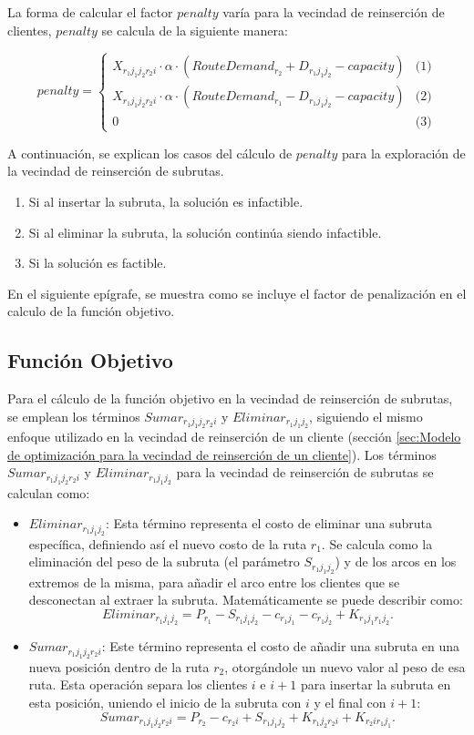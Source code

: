\documentclass[12pt]{report}
\begin{document}
	La forma de calcular el factor $penalty$ varía para la vecindad de reinserción de clientes, $penalty$ se calcula de la siguiente manera:


	\[ 			penalty =
	\begin{cases}
		X_{r_1j_1j_2r_2i} \cdot \alpha \cdot (RouteDemand_{r_2} + D_{r_1j_1j_2} - capacity) & \text{(1)} \\
		X_{r_1j_1j_2r_2i} \cdot \alpha \cdot (RouteDemand_{r_1} - D_{r_1j_1j_2} - capacity) & \text{(2)} \\
		0 & \text{(3)}
	\end{cases} \]


	A continuación, se explican los casos del cálculo de $penalty$ para la exploración de la vecindad de reinserción de subrutas.

	\begin{enumerate}
		\item Si al insertar la subruta, la solución es infactible.
		\item Si al eliminar la subruta, la solución continúa siendo infactible.
		\item Si la solución es factible.
	\end{enumerate}

	En el siguiente epígrafe, se muestra como se incluye el factor de penalización en el calculo de la función objetivo.

	\subsection{Función Objetivo}

	Para el cálculo de la función objetivo en la vecindad de reinserción de subrutas, se emplean los términos $Sumar_{r_1j_1j_2r_2i}$ y $Eliminar_{r_1j_1j_2}$, siguiendo el mismo enfoque utilizado en la vecindad de reinserción de un cliente (sección \ref{sec:Modelo de optimización para la vecindad de reinserción de un cliente}). Los términos $Sumar_{r_1j_1j_2r_2i}$ y $Eliminar_{r_1j_1j_2}$ para la vecindad de reinserción de subrutas se calculan como:

	\begin{itemize}
		\item $Eliminar_{r_1j_1j_2}$: Esta término representa el costo de eliminar una subruta específica, definiendo así el nuevo costo de la ruta $r_1$. Se calcula como la eliminación del peso de la subruta (el parámetro $S_{r_1j_1j_2}$) y de los arcos en los extremos de la misma, para añadir el arco entre los clientes que se desconectan al extraer la subruta. Matemáticamente se puede describir como:
		\[
		Eliminar_{r_1j_1j_2}= P_{r_1}-S_{{r_1}{j_1}{j_2}}-c_{{r_1}{j_1}}-c_{{r_1}{j_2}}+K_{{r_1}{j_1}{r_1}{j_2}}\text{.}
		\]
		\item $Sumar_{r_1j_1j_2r_2i}$: Este término representa el costo de añadir una subruta en una nueva posición dentro de la ruta $r_2$, otorgándole un nuevo valor al peso de esa ruta. Esta operación separa los clientes $i$ e $i+1$ para insertar la subruta en esta posición, uniendo el inicio de la subruta con $i$ y el final con $i+1$:
		\[
		Sumar_{r_1j_1j_2r_2i}= P_{r_2} - c_{{r_2}{i}} + S_{{r_1}{j_1}{j_2}}+K_{{r_1}{j_2}{r_2}{i}} + K_{{r_2}{i}{r_1}{j_1}}\text{.}
		\]
	\end{itemize}
\end{document}
